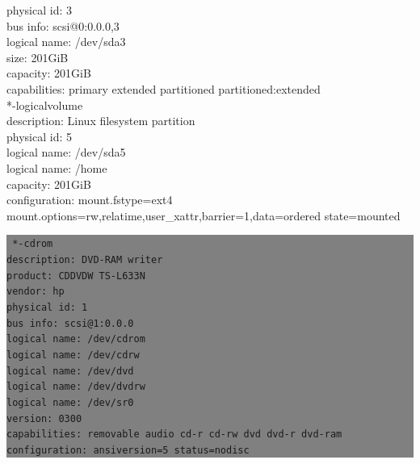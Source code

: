 \documentclass[12pt]{article}
\begin{document}
{{{{                   physical id: 3\\
                   bus info: scsi@0:0.0.0,3\\
                   logical name: /dev/sda3\\
                   size: 201GiB\\
                   capacity: 201GiB\\
                   capabilities: primary extended partitioned partitioned:extended\\
                 *-logicalvolume\\
                      description: Linux filesystem partition\\
                      physical id: 5\\
                      logical name: /dev/sda5\\
                      logical name: /home\\
                      capacity: 201GiB\\
                      configuration: mount.fstype=ext4 mount.options=rw,relatime,user\_xattr,barrier=1,data=ordered state=mounted\\
}
} \vspace*{0.5cm} } } 

\colorbox{grey}{\parbox[t]{0.95\linewidth}{ \vspace*{0.5cm} { 
{\tt
           *-cdrom\\
                description: DVD-RAM writer\\
                product: CDDVDW TS-L633N\\
                vendor: hp\\
                physical id: 1\\
                bus info: scsi@1:0.0.0\\
                logical name: /dev/cdrom\\
                logical name: /dev/cdrw\\
                logical name: /dev/dvd\\
                logical name: /dev/dvdrw\\
                logical name: /dev/sr0\\
                version: 0300\\
                capabilities: removable audio cd-r cd-rw dvd dvd-r dvd-ram\\
                configuration: ansiversion=5 status=nodisc\\

}
} \vspace*{0.5cm} } } 
\end{document}
